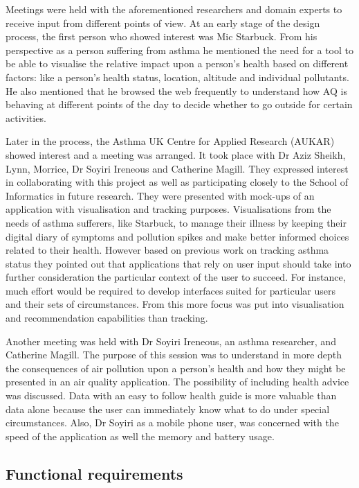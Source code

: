 Meetings were held with the aforementioned researchers and domain experts to receive input from different points of view. At an early stage of the design process, the first person who showed interest was Mic Starbuck. From his perspective as a person suffering from asthma he mentioned the need for a tool to be able to visualise the relative impact upon a person's health based on different factors: like a person's health status, location, altitude and individual pollutants. He also mentioned that he browsed the web frequently to understand how AQ is behaving at different points of the day to decide whether to go outside for certain activities. 

Later in the process, the Asthma UK Centre for Applied Research (AUKAR) showed interest and a meeting was arranged. It took place with Dr Aziz Sheikh, Lynn, Morrice, Dr Soyiri Ireneous and Catherine Magill. They expressed interest in collaborating with this project as well as participating closely to the School of Informatics in future research. They were presented with mock-ups of an application with visualisation and tracking purposes. Visualisations from the needs of asthma sufferers, like Starbuck, to manage their illness by keeping their digital diary of symptoms and pollution spikes and make better informed choices related to their health. However based on previous work on tracking asthma status they pointed out that applications that rely on user input should take into further consideration the particular context of the user to succeed. For instance, much effort would be required to develop interfaces suited for particular users and their sets of circumstances. From this more focus was put into visualisation and recommendation capabilities than tracking.

Another meeting was held with Dr Soyiri Ireneous, an asthma researcher, and Catherine Magill. The purpose of this session was to understand in more depth the consequences of air pollution upon a person's health and how they might be presented in an air quality application. The possibility of including health advice was discussed. Data  with an easy to follow health guide is more valuable than data alone because the user can immediately know what to do under special circumstances. Also, Dr Soyiri as a mobile phone user, was concerned with the speed of the application as well the memory and battery usage.

\subsection{Functional requirements}

